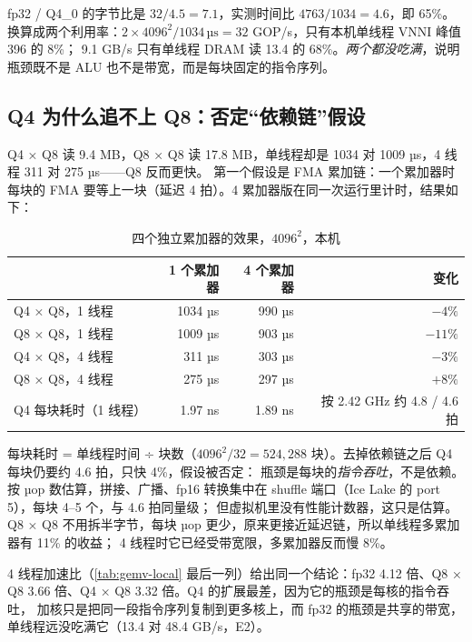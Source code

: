 \documentclass[11pt,a4paper]{ctexart}
\begin{document}
\begin{findingbox}[：Q4 单线程只兑现了字节比的 65\%]
fp32 / Q4\_0 的字节比是 $32/4.5 = 7.1$，实测时间比 $4763/1034 = 4.6$，即 65\%。换算成两个利用率：$2\times4096^2 / 1034\,\text{µs} = 32$ GOP/s，只有本机单线程 VNNI 峰值 396 的 8\%；
9.1 GB/s 只有单线程 DRAM 读 13.4 的 68\%。\emph{两个都没吃满}，说明瓶颈既不是 ALU 也不是带宽，而是每块固定的指令序列。
\end{findingbox}

\subsection{Q4 为什么追不上 Q8：否定“依赖链”假设}

Q4 × Q8 读 9.4 MB，Q8 × Q8 读 17.8 MB，单线程却是 1034 对 1009 µs，4 线程 311 对 275 µs——Q8 反而更快。
第一个假设是 FMA 累加链：一个累加器时每块的 FMA 要等上一块（延迟 4 拍）。4 累加器版在同一次运行里计时，结果如下：

\begin{table}[H]
\centering\small
\caption{四个独立累加器的效果，$4096^2$，本机}\label{tab:4acc}
\begin{tabular}{lrrr}
\toprule
 & 1 个累加器 & 4 个累加器 & 变化 \\
\midrule
Q4 × Q8，1 线程 & 1034 µs & 990 µs & $-4\%$ \\
Q8 × Q8，1 线程 & 1009 µs & 903 µs & $-11\%$ \\
Q4 × Q8，4 线程 & 311 µs & 303 µs & $-3\%$ \\
Q8 × Q8，4 线程 & 275 µs & 297 µs & $+8\%$ \\
Q4 每块耗时（1 线程） & 1.97 ns & 1.89 ns & 按 2.42 GHz 约 4.8 / 4.6 拍 \\
\bottomrule
\end{tabular}
\end{table}

每块耗时 = 单线程时间 ÷ 块数（$4096^2/32 = 524{,}288$ 块）。去掉依赖链之后 Q4 每块仍要约 4.6 拍，只快 4\%，假设被否定：
瓶颈是每块的\emph{指令吞吐}，不是依赖。按 µop 数估算，拼接、广播、fp16 转换集中在 shuffle 端口（Ice Lake 的 port 5），每块 4--5 个，与 4.6 拍同量级；
但虚拟机里没有性能计数器，这只是估算。Q8 × Q8 不用拆半字节，每块 µop 更少，原来更接近延迟链，所以单线程多累加器有 11\% 的收益；
4 线程时它已经受带宽限，多累加器反而慢 8\%。

4 线程加速比（\cref{tab:gemv-local} 最后一列）给出同一个结论：fp32 4.12 倍、Q8 × Q8 3.66 倍、Q4 × Q8 3.32 倍。Q4 的扩展最差，因为它的瓶颈是每核的指令吞吐，
加核只是把同一段指令序列复制到更多核上，而 fp32 的瓶颈是共享的带宽，单线程远没吃满它（13.4 对 48.4 GB/s，E2）。
\end{document}
